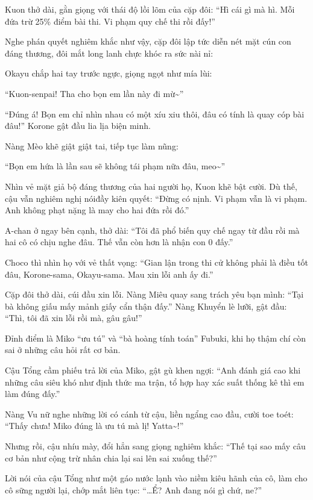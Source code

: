 \documentclass[../main.tex]{subfiles}
\begin{document}
Kuon thở dài, gằn giọng với thái độ lồi lõm của cặp đôi: ``Hì cái gì mà hì. Mỗi đứa trừ 25\% điểm bài thi. Vi phạm quy chế thi rồi đấy!''

Nghe phán quyết nghiêm khắc như vậy, cặp đôi lập tức diễn nét mặt cún con đáng thương, đôi mắt long lanh chực khóc ra sức nài nỉ:

Okayu chắp hai tay trước ngực, giọng ngọt như mía lùi:

``Kuon-senpai! Tha cho bọn em lần này đi mừ\~{}''

``Đúng á! Bọn em chỉ nhìn nhau có một xíu xiu thôi, đâu có tính là quay cóp bài đâu!'' Korone gật đầu lia lịa biện minh.

Nàng Mèo khẽ giật giật tai, tiếp tục làm nũng:

``Bọn em hứa là lần sau sẽ không tái phạm nữa đâu, meo\~{}''

Nhìn vẻ mặt giả bộ đáng thương của hai người họ, Kuon khẽ bật cười. Dù thế, cậu vẫn nghiêm nghị nóiđầy kiên quyết: ``Đừng có nịnh. Vi phạm vẫn là vi phạm. Anh không phạt nặng là may cho hai đứa rồi đó.''

A-chan ở ngay bên cạnh, thở dài: ``Tôi đã phổ biến quy chế ngay từ đầu rồi mà hai cô có chịu nghe đâu. Thế vẫn còn hơn là nhận con 0 đấy.''

Choco thì nhìn họ với vẻ thất vọng: ``Gian lận trong thi cử không phải là điều tốt đâu, Korone-sama, Okayu-sama. Mau xin lỗi anh ấy đi.''

Cặp đôi thở dài, cúi đầu xin lỗi. Nàng Miêu quay sang trách yêu bạn mình: ``Tại bà không giấu mấy mảnh giấy cẩn thận đấy.'' Nàng Khuyển lè lưỡi, gật đầu: ``Thì, tôi đã xin lỗi rồi mà, gâu gâu!''

\ct

Đỉnh điểm là Miko ``ưu tú'' và ``bà hoàng tính toán'' Fubuki, khi họ thậm chí còn sai ở những câu hỏi rất cơ bản.

Cậu Tổng cầm phiếu trả lời của Miko, gật gù khen ngợi: ``Anh đánh giá cao khi những câu siêu khó như định thức ma trận, tổ hợp hay xác suất thống kê thì em làm đúng đấy.''

Nàng Vu nữ nghe những lời có cánh từ cậu, liền ngẩng cao đầu, cười toe toét: ``Thấy chưa! Miko đúng là ưu tú mà lị! Yatta\~{}!''

Nhưng rồi, cậu nhíu mày, đổi hẳn sang giọng nghiêm khắc: ``Thế tại sao mấy câu cơ bản như cộng trừ nhân chia lại sai lên sai xuống thế?''

Lời nói của cậu Tổng như một gáo nước lạnh vào niềm kiêu hãnh của cô, làm cho cô sững người lại, chớp mắt liên tục: ``\dots Ể? Anh đang nói gì chứ, ne?''
\end{document}
